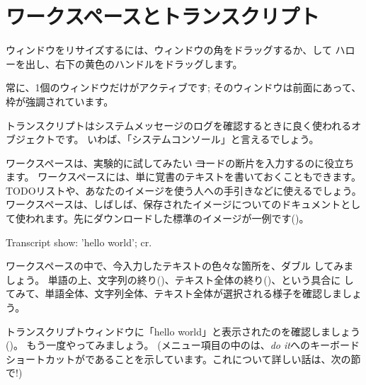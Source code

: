 \documentclass[a4paper,10pt,twoside]{book}
\begin{document}
\section{ワークスペースとトランスクリプト}


ウィンドウをリサイズするには、ウィンドウの角をドラッグするか、\metaclick して ハローを出し、右下の黄色のハンドルをドラッグします。

常に、1個のウィンドウだけがアクティブです; そのウィンドウは前面にあって、枠が強調されています。

トランスクリプトはシステムメッセージのログを確認するときに良く使われるオブジェクトです。
いわば、「システムコンソール」と言えるでしょう。

ワークスペースは、実験的に試してみたい \st コードの断片を入力するのに役立ちます。
ワークスペースには、単に覚書のテキストを書いておくこともできます。TODOリストや、あなたのイメージを使う人への手引きなどに使えるでしょう。
ワークスペースは、しばしば、保存されたイメージについてのドキュメントとして使われます。先にダウンロードした標準のイメージが一例です()。

\begin{code}{}
Transcript show: 'hello world'; cr.
\end{code}

ワークスペースの中で、今入力したテキストの色々な箇所を、ダブル \click してみましょう。
単語の上、文字列の終り()、テキスト全体の終り()、という具合に \click してみて、単語全体、文字列全体、テキスト全体が選択される様子を確認しましょう。

トランスクリプトウィンドウに「hello world」と表示されたのを確認しましょう
()。
もう一度やってみましょう。
(メニュー項目の中のは、\emph{do it}へのキーボードショートカットがであることを示しています。これについて詳しい話は、次の節で!)
\end{document}
